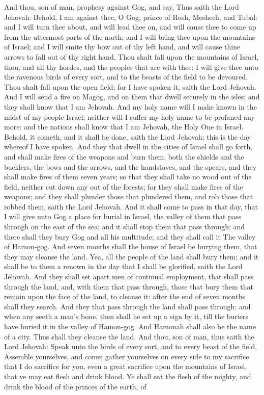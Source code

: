 And thou, son of man, prophesy against Gog, and say, Thus saith the Lord Jehovah: Behold, I am against thee, O Gog, prince of Rosh, Meshech, and Tubal: and I will turn thee about, and will lead thee on, and will cause thee to come up from the uttermost parts of the north; and I will bring thee upon the mountains of Israel; and I will smite thy bow out of thy left hand, and will cause thine arrows to fall out of thy right hand. Thou shalt fall upon the mountains of Israel, thou, and all thy hordes, and the peoples that are with thee: I will give thee unto the ravenous birds of every sort, and to the beasts of the field to be devoured. Thou shalt fall upon the open field; for I have spoken it, saith the Lord Jehovah. And I will send a fire on Magog, and on them that dwell securely in the isles; and they shall know that I am Jehovah. And my holy name will I make known in the midst of my people Israel; neither will I suffer my holy name to be profaned any more: and the nations shall know that I am Jehovah, the Holy One in Israel. Behold, it cometh, and it shall be done, saith the Lord Jehovah; this is the day whereof I have spoken. And they that dwell in the cities of Israel shall go forth, and shall make fires of the weapons and burn them, both the shields and the bucklers, the bows and the arrows, and the handstaves, and the spears, and they shall make fires of them seven years; so that they shall take no wood out of the field, neither cut down any out of the forests; for they shall make fires of the weapons; and they shall plunder those that plundered them, and rob those that robbed them, saith the Lord Jehovah.  And it shall come to pass in that day, that I will give unto Gog a place for burial in Israel, the valley of them that pass through on the east of the sea; and it shall stop them that pass through: and there shall they bury Gog and all his multitude; and they shall call it The valley of Hamon-gog. And seven months shall the house of Israel be burying them, that they may cleanse the land. Yea, all the people of the land shall bury them; and it shall be to them a renown in the day that I shall be glorified, saith the Lord Jehovah. And they shall set apart men of continual employment, that shall pass through the land, and, with them that pass through, those that bury them that remain upon the face of the land, to cleanse it: after the end of seven months shall they search. And they that pass through the land shall pass through; and when any seeth a man’s bone, then shall he set up a sign by it, till the buriers have buried it in the valley of Hamon-gog. And Hamonah shall also be the name of a city. Thus shall they cleanse the land.  And thou, son of man, thus saith the Lord Jehovah: Speak unto the birds of every sort, and to every beast of the field, Assemble yourselves, and come; gather yourselves on every side to my sacrifice that I do sacrifice for you, even a great sacrifice upon the mountains of Israel, that ye may eat flesh and drink blood. Ye shall eat the flesh of the mighty, and drink the blood of the princes of the earth, of 